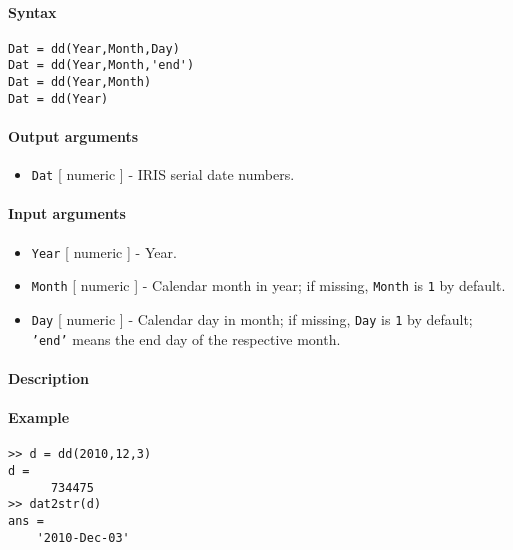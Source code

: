 


	\paragraph{Syntax}

\begin{verbatim}
Dat = dd(Year,Month,Day)
Dat = dd(Year,Month,'end')
Dat = dd(Year,Month)
Dat = dd(Year)
\end{verbatim}

\paragraph{Output arguments}

\begin{itemize}
\itemsep1pt\parskip0pt
\item
  \texttt{Dat} {[} numeric {]} - IRIS serial date numbers.
\end{itemize}

\paragraph{Input arguments}

\begin{itemize}
\item
  \texttt{Year} {[} numeric {]} - Year.
\item
  \texttt{Month} {[} numeric {]} - Calendar month in year; if missing,
  \texttt{Month} is \texttt{1} by default.
\item
  \texttt{Day} {[} numeric {]} - Calendar day in month; if missing,
  \texttt{Day} is \texttt{1} by default; \texttt{'end'} means the end
  day of the respective month.
\end{itemize}

\paragraph{Description}

\paragraph{Example}

\begin{verbatim}
>> d = dd(2010,12,3)
d =
      734475
>> dat2str(d)
ans =  
    '2010-Dec-03'
\end{verbatim}


